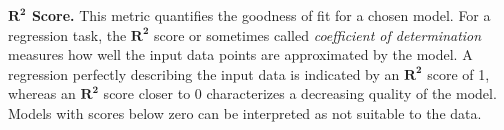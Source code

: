 %
\textbf{$\symbf{R^2}$ Score.} This metric quantifies the goodness of fit for a
chosen model. For a regression task, the $\symbf{R^2}$ score or sometimes
called \textit{coefficient of determination} measures how well the input data
points are approximated by the model. A regression perfectly describing the
input data is indicated by an $\symbf{R^2}$ score of 1, whereas an
$\symbf{R^2}$ score closer to \num{0} characterizes a decreasing quality of the
model. Models with scores below zero can be interpreted as not suitable to the
data.

